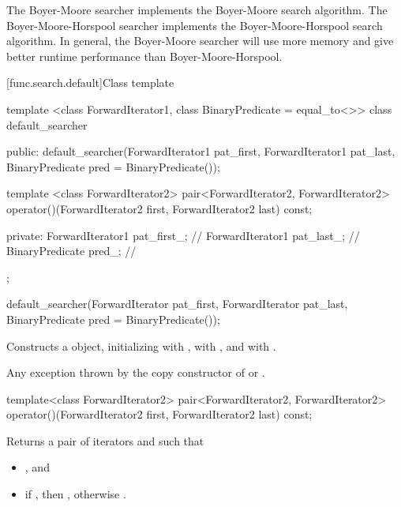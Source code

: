 \pnum
The Boyer-Moore searcher implements the Boyer-Moore search algorithm.
The Boyer-Moore-Horspool searcher implements the Boyer-Moore-Horspool search algorithm.
In general, the Boyer-Moore searcher will use more memory and give better runtime performance than Boyer-Moore-Horspool.

[func.search.default]{Class template }

%
\begin{codeblock}
template <class ForwardIterator1, class BinaryPredicate = equal_to<>>
  class default_searcher {
  public:
    default_searcher(ForwardIterator1 pat_first, ForwardIterator1 pat_last,
                     BinaryPredicate pred = BinaryPredicate());

    template <class ForwardIterator2>
      pair<ForwardIterator2, ForwardIterator2>
        operator()(ForwardIterator2 first, ForwardIterator2 last) const;

  private:
    ForwardIterator1 pat_first_;        // \expos
    ForwardIterator1 pat_last_;         // \expos
    BinaryPredicate pred_;              // \expos
  };
\end{codeblock}

%
\begin{itemdecl}
default_searcher(ForwardIterator pat_first, ForwardIterator pat_last,
                 BinaryPredicate pred = BinaryPredicate());
\end{itemdecl}

\begin{itemdescr}
\pnum
\effects
Constructs a  object, initializing 
with , \mbox{} with , and
 with .

\pnum
\throws
Any exception thrown by the copy constructor of  or
.
\end{itemdescr}

%
\begin{itemdecl}
template<class ForwardIterator2>
  pair<ForwardIterator2, ForwardIterator2>
    operator()(ForwardIterator2 first, ForwardIterator2 last) const;
\end{itemdecl}

\begin{itemdescr}
\pnum
\effects
Returns a pair of iterators  and  such that
\begin{itemize}
\item {}, and
\item if , then ,
otherwise .
\end{itemize}
\end{itemdescr}

